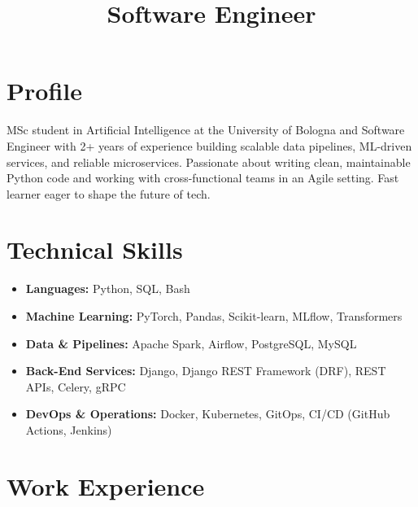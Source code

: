 \documentclass[11pt,a4paper,sans]{moderncv}
\title{Software Engineer} %
\begin{document}
\makecvtitle

\vspace {-2em}

\section{Profile}
\vspace{-1mm}
MSc student in Artificial Intelligence at the University of Bologna and Software Engineer with 2+ years of experience building scalable data pipelines, ML-driven services, and reliable microservices. Passionate about writing clean, maintainable Python code and working with cross-functional teams in an Agile setting. Fast learner eager to shape the future of tech.

\section{Technical Skills}
\begin{itemize}
    \item \textbf{Languages:} Python, SQL, Bash
    \item \textbf{Machine Learning:} PyTorch, Pandas, Scikit-learn, MLflow, Transformers
    \item \textbf{Data \& Pipelines:} Apache Spark, Airflow, PostgreSQL, MySQL
    \item \textbf{Back-End Services:} Django, Django REST Framework (DRF), REST APIs, Celery, gRPC
    \item \textbf{DevOps \& Operations:} Docker, Kubernetes, GitOps, CI/CD (GitHub Actions, Jenkins)
\end{itemize}

\section{Work Experience}
\vspace{1mm}

\vspace{1mm}
\end{document}
